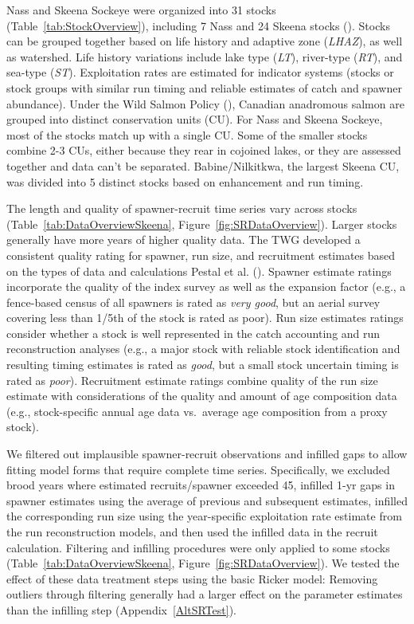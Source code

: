 \documentclass[french,11pt]{book}
\begin{document}
Nass and Skeena Sockeye were organized into 31 stocks (Table~\ref{tab:StockOverview}), including 7 Nass and 24 Skeena stocks (). Stocks can be grouped together based on life history and adaptive zone (\emph{LHAZ}), as well as watershed. Life history variations include lake type (\emph{LT}), river-type (\emph{RT}), and sea-type (\emph{ST}). Exploitation rates are estimated for indicator systems (stocks or stock groups with similar run timing and reliable estimates of catch and spawner abundance). Under the Wild Salmon Policy (), Canadian anadromous salmon are grouped into distinct conservation units (CU). For Nass and Skeena Sockeye, most of the stocks match up with a single CU. Some of the smaller stocks combine 2-3 CUs, either because they rear in cojoined lakes, or they are assessed together and data can't be separated. Babine/Nilkitkwa, the largest Skeena CU, was divided into 5 distinct stocks based on enhancement and run timing.

The length and quality of spawner-recruit time series vary across stocks (Table~\ref{tab:DataOverviewSkeena}, Figure~\ref{fig:SRDataOverview}). Larger stocks generally have more years of higher quality data. The TWG developed a consistent quality rating for spawner, run size, and recruitment estimates based on the types of data and calculations Pestal et al. (). Spawner estimate ratings incorporate the quality of the index survey as well as the expansion factor (e.g., a fence-based census of all spawners is rated as \emph{very good}, but an aerial survey covering less than 1/5th of the stock is rated as poor). Run size estimates ratings consider whether a stock is well represented in the catch accounting and run reconstruction analyses (e.g., a major stock with reliable stock identification and resulting timing estimates is rated as \emph{good}, but a small stock uncertain timing is rated as \emph{poor}). Recruitment estimate ratings combine quality of the run size estimate with considerations of the quality and amount of age composition data (e.g., stock-specific annual age data vs.~average age composition from a proxy stock).

We filtered out implausible spawner-recruit observations and infilled gaps to allow fitting model forms that require complete time series. Specifically, we excluded brood years where estimated recruits/spawner exceeded 45, infilled 1-yr gaps in spawner estimates using the average of previous and subsequent estimates, infilled the corresponding run size using the year-specific exploitation rate estimate from the run reconstruction models, and then used the infilled data in the recruit calculation. Filtering and infilling procedures were only applied to some stocks (Table~\ref{tab:DataOverviewSkeena}, Figure~\ref{fig:SRDataOverview}). We tested the effect of these data treatment steps using the basic Ricker model: Removing outliers through filtering generally had a larger effect on the parameter estimates than the infilling step (Appendix~\ref{AltSRTest}).
\end{document}
